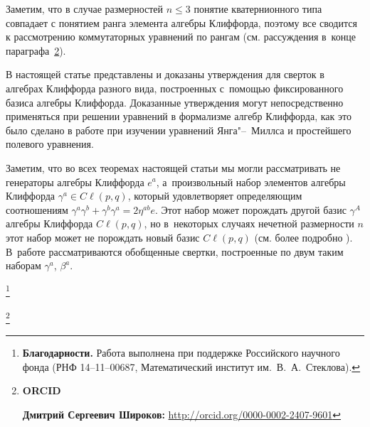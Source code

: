 Заметим, что в случае размерностей $n\leq 3$ понятие кватернионного типа совпадает с понятием ранга элемента алгебры Клиффорда, поэтому все сводится к рассмотрению коммутаторных уравнений по рангам (см. рассуждения в~конце параграфа~\hyperlink{shir:par2}{2}).

\smallskip

В настоящей статье представлены и доказаны утверждения для сверток в алгебрах Клиффорда разного вида, построенных с~помощью фиксированного базиса алгебры Клиффорда. 
Доказанные утверждения могут непосредственно применяться при решении уравнений в формализме алгебр Клиффорда, как это было сделано в работе \cite{shir:YM} при изучении уравнений Янга"--~Миллса и простейшего полевого уравнения.

Заметим, что во всех теоремах настоящей статьи мы могли рассматривать не генераторы алгебры Клиффорда $e^a$, а~произвольный набор элементов алгебры Клиффорда $\gamma^a\in{{C}\!\ell}(p,q)$, который удовлетворяет определяющим соотношениям $\gamma^a \gamma^b+ \gamma^b \gamma^a=2\eta^{ab}e$. 
Этот набор может порождать другой базис $\gamma^A$ алгебры Клиффорда ${{C}\!\ell}(p,q)$, 
но в~некоторых случаях нечетной размерности $n$ этот набор может не порождать новый базис ${{C}\!\ell}(p,q)$ (см. более подробно \cite{shir:gencontr}). 
В~работе \cite{shir:gencontr} рассматриваются обобщенные свертки, построенные по двум таким наборам $\gamma^a$, $\beta^a$.



\thanks{\textbf{Благодарности.} 
Работа выполнена при поддержке Российского научного фонда (РНФ 14--11--00687, Математический институт им.~В.~А.~Стеклова).
}

\thanks{{\bf ORCID}

{\bf Дмитрий Сергеевич Широков:} \url{http://orcid.org/0000-0002-2407-9601}


}


\RusRef

